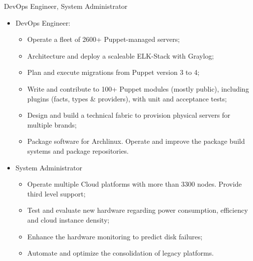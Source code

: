 %
  {DevOps Engineer, System Administrator
\begin{itemize}
  \item DevOps Engineer:
    \begin{itemize}
      \item Operate a fleet of 2600+ Puppet-managed servers;
      \item Architecture and deploy a scaleable ELK-Stack with Graylog;
      \item Plan and execute migrations from Puppet version 3 to 4;
      \item Write and contribute to 100+ Puppet modules (mostly public), including plugins (facts, types \& providers), with unit and acceptance tests;
      \item Design and build a technical fabric to provision physical servers for multiple brands;
      \item Package software for Archlinux. Operate and improve the package build systems and package repositories.
    \end{itemize}
  \item System Administrator
    \begin{itemize}
      \item Operate multiple Cloud platforms with more than 3300 nodes. Provide third level support;
      \item Test and evaluate new hardware regarding power consumption, efficiency and cloud instance density;
      \item Enhance the hardware monitoring to predict disk failures;
      \item Automate and optimize the consolidation of legacy platforms.
    \end{itemize}
\end{itemize}}


